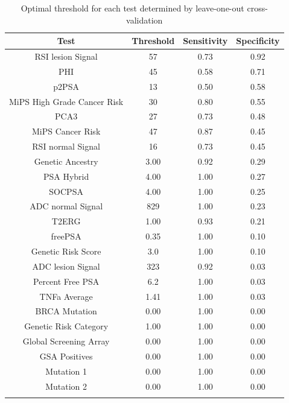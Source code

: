 \documentclass[]{article}
\begin{document}
\begin{longtable}{|c|c|c|c|} 
\hline
{\bf Test } & {\bf Threshold} & {\bf Sensitivity} & {\bf Specificity} \\
\hline
      RSI lesion Signal  &  57  &  0.73 & 0.92  \\
\hline
                  PHI  &  45  &  0.58 & 0.71  \\
\hline
                p2PSA  &  13  &  0.50 & 0.58  \\
\hline
     MiPS High Grade Cancer Risk  &  30  &  0.80 & 0.55  \\
\hline
                 PCA3  &  27  &  0.73 & 0.48  \\
\hline
       MiPS Cancer Risk  &  47  &  0.87 & 0.45  \\
\hline
      RSI normal Signal  &  16  &  0.73 & 0.45  \\
\hline
      Genetic Ancestry  &   3.00  &  0.92 & 0.29  \\
\hline
               PSA Hybrid  &  4.00  &  1.00 & 0.27  \\
\hline
               SOCPSA  &   4.00  &  1.00 & 0.25  \\
\hline
      ADC normal Signal  & 829  &  1.00 & 0.23  \\
\hline
                T2ERG  &   1.00  &  0.93 & 0.21  \\
\hline
              freePSA  &   0.35  &  1.00 & 0.10  \\ 
\hline
     Genetic Risk Score  &   3.0  &  1.00 & 0.10  \\
\hline
      ADC lesion Signal  & 323  &  0.92 & 0.03  \\
\hline
       Percent Free PSA  &   6.2  &  1.00 & 0.03  \\
\hline
          TNFa Average  &   1.41  &  1.00 & 0.03  \\
\hline
         BRCA Mutation  &   0.00  &  1.00 & 0.00  \\  
\hline
  Genetic Risk Category  &   1.00  &  1.00 & 0.00  \\  
\hline
 Global Screening Array  &   0.00  &  1.00 & 0.00  \\ 
\hline
         GSA Positives  &   0.00  &  1.00 & 0.00  \\ 
\hline
            Mutation 1  &   0.00  &  1.00 & 0.00  \\ 
\hline
            Mutation 2  &   0.00  &  1.00 & 0.00  \\
\hline
\caption{Optimal threshold for each test determined by leave-one-out cross-validation}
\label{tab:optimal}
\end{longtable}
\end{document}
